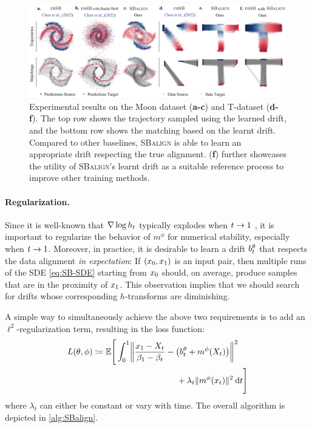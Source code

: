 \begin{figure}[t]
    \centering
    \includegraphics[width=\textwidth]{figures/fig_results_synthetic.jpg}
    \caption{Experimental results on the Moon dataset (\textbf{a-c}) and T-dataset (\textbf{d-f}). The top row shows the trajectory sampled using the learned drift, and the bottom row shows the matching based on the learnt drift. Compared to other baselines, \textsc{SBalign} is able to learn an appropriate drift respecting the true alignment. (\textbf{f}) further showcases the utility of \textsc{SBalign}'s learnt drift as a suitable reference process to improve other training methods.}
    \label{fig:results_spiral}
\end{figure}

\paragraph{Regularization.}
Since it is well-known that $\nabla \log h_t$ typically explodes when $t\to 1$ \citep{liu2023learning}, it is important to regularize the behavior of $m^{\phi}$ for numerical stability, especially when $t\to 1$. Moreover, in practice, it is desirable to learn a drift $b_t^\theta$ that respects the data alignment \emph{in expectation}: If $(x_0,x_1)$ is an input pair, then multiple runs of the \acrshort{SDE} \eqref{eq:SB-SDE} starting from $x_0$ should, on average, produce samples that are in the proximity of $x_1$. This observation implies that we should search for drifts whose corresponding $h$-transforms are diminishing.

A simple way to simultaneously achieve the above two requirements is to add an $\ell^2$-regularization term, resulting in the loss function:
\begin{align}
\label{eq:loss_final}
\Loss(\theta,\phi) &\defeq \mathbb{E} \Bigg[\int_0^1 \norm*{\frac{\x_1-X_t}{\cvolat[\horizon]-\cvolat[\ctime]}- \left(\fdrift^\theta + m^{\phi}(X_t)\right)}^2
\\ &\hspace{35mm}+ \lambda_t \norm{m^{\phi}(\x_t)}^2 \dt \Bigg]
\nonumber
\end{align}where $\lambda_t$ can either be constant or vary with time. The overall algorithm is depicted in \cref{alg:SBalign}.



